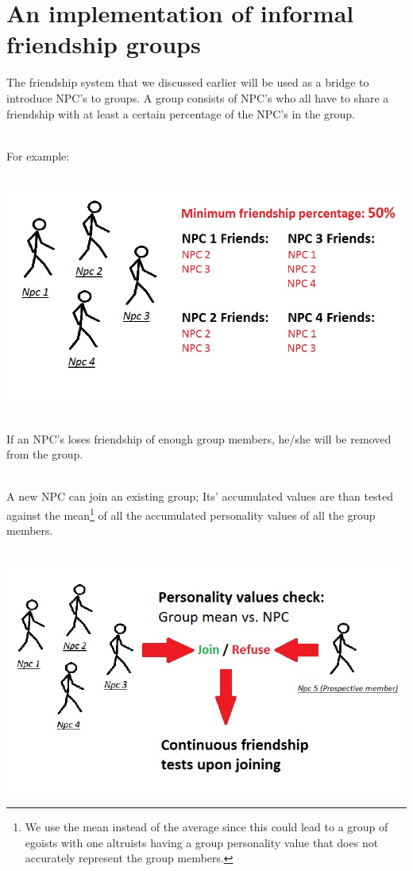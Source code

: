 \documentclass[11pt]{article} %
\begin{document}
\newpage
\section{An implementation of informal friendship groups}
The friendship system that we discussed earlier will be used as a bridge to introduce NPC's to groups. A group consists of NPC's who all have to share a friendship with at least a certain percentage of the NPC's in the group. 

~\\
For example:

~\\
\includegraphics[scale=0.7]{group} 



~\\
If an NPC's loses friendship of enough group members, he/she will be removed from the group.

~\\


\newpage
A new NPC can join an existing group; Its' accumulated values are than tested against the mean\footnote{We use the mean instead of the average since this could lead to a group of egoists with one altruists having a group personality value that does not accurately represent the group members.} of all the accumulated personality values of all the group members.

~\\
\includegraphics[scale=0.7]{groupJoining}
\end{document}
